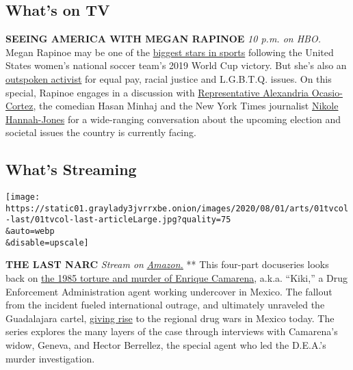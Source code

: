 \hypertarget{whats-on-tv}{%
\subsection{What's on TV}\label{whats-on-tv}}

\textbf{SEEING AMERICA WITH MEGAN RAPINOE} \emph{10 p.m. on HBO.} Megan
Rapinoe may be one of the
\href{https://www.nytimes3xbfgragh.onion/2019/12/18/sports/year-of-victory-advocacy.html}{biggest
stars in sports} following the United States women's national soccer
team's 2019 World Cup victory. But she's also an
\href{https://www.nytimes3xbfgragh.onion/interactive/2019/07/29/magazine/megan-rapinoe-sports-politics.html}{outspoken
activist} for equal pay, racial justice and L.G.B.T.Q. issues. On this
special, Rapinoe engages in a discussion with
\href{https://www.nytimes3xbfgragh.onion/2020/07/23/us/alexandria-ocasio-cortez-sexism-congress.html}{Representative
Alexandria Ocasio-Cortez}, the comedian Hasan Minhaj and the New York
Times journalist
\href{https://www.nytimes3xbfgragh.onion/by/nikole-hannah-jones}{Nikole
Hannah-Jones} for a wide-ranging conversation about the upcoming
election and societal issues the country is currently facing.

\hypertarget{whats-streaming}{%
\subsection{What's Streaming}\label{whats-streaming}}

\texttt{[image: https://static01.graylady3jvrrxbe.onion/images/2020/08/01/arts/01tvcol-last/01tvcol-last-articleLarge.jpg?quality=75\\\&auto=webp\\\&disable=upscale]}

\textbf{THE LAST NARC} \emph{Stream on}
\href{https://www.amazon.com/The-Last-Narc-Season-1/dp/B0876N8XXZ}{\emph{Amazon.}}
** This four-part docuseries looks back on
\href{https://www.nytimes3xbfgragh.onion/1985/03/07/world/body-of-us-drug-agent-believed-found-in-mexico.html}{the
1985 torture and murder of Enrique Camarena}, a.k.a. ``Kiki,'' a Drug
Enforcement Administration agent working undercover in Mexico. The
fallout from the incident fueled international outrage, and ultimately
unraveled the Guadalajara cartel,
\href{https://www.latimes.com/world/mexico-americas/la-fg-mexico-gallardo-20170824-story.html}{giving
rise} to the regional drug wars in Mexico today. The series explores the
many layers of the case through interviews with Camarena's widow,
Geneva, and Hector Berrellez, the special agent who led the D.E.A.'s
murder investigation.

